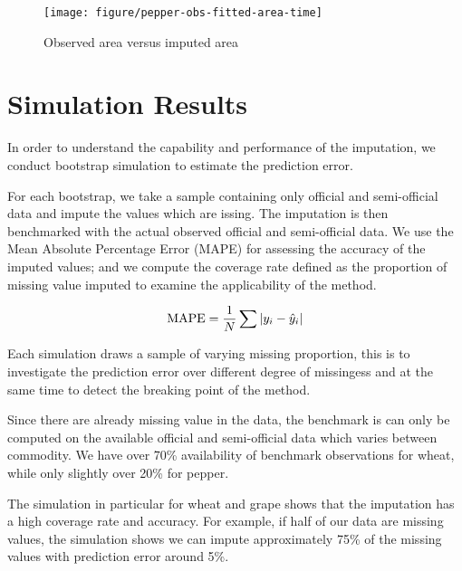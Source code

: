 \documentclass[nojss]{jss}\usepackage[]{graphicx}\usepackage[]{color}
\makeatletter
\def\maxwidth{ %
  \ifdim\Gin@nat@width>\linewidth
    \linewidth
  \else
    \Gin@nat@width
  \fi
}
\newenvironment{knitrout}{}{} %
\makeatother
\begin{document}
\begin{knitrout}
\color{fgcolor}\begin{figure}[!ht]


{\centering \texttt{[image: figure/pepper-obs-fitted-area-time]} 

}

\caption[Observed area versus imputed area]{Observed area versus imputed area\label{fig:pepper-obs-fitted-area-time}}
\end{figure}


\end{knitrout}


\FloatBarrier
\section{Simulation Results}

In order to understand the capability and performance of the
imputation, we conduct bootstrap simulation to estimate the prediction
error.

For each bootstrap, we take a sample containing only official and
semi-official data and impute the values which are issing. The
imputation is then benchmarked with the actual observed official and
semi-official data. We use the Mean Absolute Percentage Error (MAPE)
for assessing the accuracy of the imputed values; and we compute the
coverage rate defined as the proportion of missing value imputed to
examine the applicability of the method.

\begin{equation}
  \text{MAPE} = \frac{1}{N} \sum |y_i - \hat{y}_i|\\
\end{equation}


Each simulation draws a sample of varying missing proportion, this is
to investigate the prediction error over different degree of
missingess and at the same time to detect the breaking point of the
method.

Since there are already missing value in the data, the benchmark is
can only be computed on the available official and semi-official data
which varies between commodity. We have over 70\% availability of
benchmark observations for wheat, while only slightly over 20\% for
pepper.


The simulation in particular for wheat and grape shows that the
imputation has a high coverage rate and accuracy. For example, if
half of our data are missing values, the simulation shows we can
impute approximately 75\% of the missing values with prediction error
around 5\%.
\end{document}
